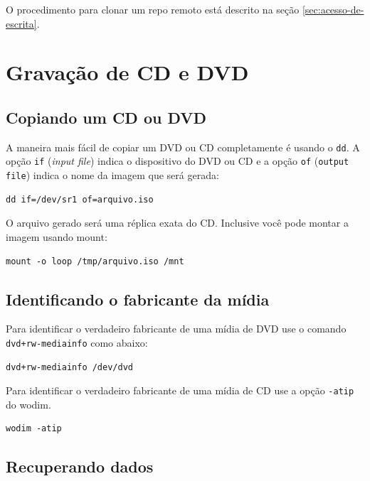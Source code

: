 \documentclass[12pt,brazil]{book}
\begin{document}
O procedimento para clonar um repo remoto está descrito na seção
\ref{sec:acesso-de-escrita}.

\chapter{Gravação de CD e DVD}
\label{cha:gravacao-de-cd}

\section{Copiando um CD ou DVD}
\label{sec:copiando-um-cd}

A maneira mais fácil de copiar um DVD ou CD completamente é usando o
\texttt{dd}. A opção \texttt{if} (\textit{input file}) indica o
dispositivo do DVD ou CD e a opção \texttt{of} (\texttt{output file})
indica o nome da imagem que será gerada:

\begin{verbatim}
dd if=/dev/sr1 of=arquivo.iso
\end{verbatim}

O arquivo gerado será uma réplica exata do CD. Inclusive você pode
montar a imagem usando mount:

\begin{verbatim}
mount -o loop /tmp/arquivo.iso /mnt
\end{verbatim}

\section{Identificando o fabricante da mídia}
\label{sec:ident-o-fabr}

Para identificar o verdadeiro fabricante de uma mídia de DVD use o
comando \texttt{dvd+rw-mediainfo} como abaixo:

\begin{verbatim}
dvd+rw-mediainfo /dev/dvd
\end{verbatim}

Para identificar o verdadeiro fabricante de uma mídia de CD use a
opção \texttt{-atip} do wodim.

\begin{verbatim}
wodim -atip 
\end{verbatim}

\section{Recuperando dados}
\label{sec:recuperando-dados}
\end{document}
